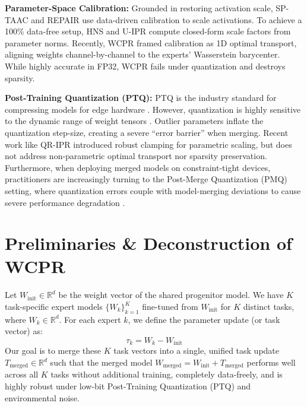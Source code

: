 \documentclass{article}
\theoremstyle{plain}
\theoremstyle{definition}
\theoremstyle{remark}
\begin{document}
\textbf{Parameter-Space Calibration:} Grounded in restoring activation scale, SP-TAAC \cite{leclaire2024isotropic} and REPAIR \cite{jordan2023repair} use data-driven calibration to scale activations. To achieve a 100\% data-free setup, HNS \cite{visionary2026hns} and U-IPR \cite{leclaire2024isotropic} compute closed-form scale factors from parameter norms. Recently, WCPR \cite{theorist2026wcpr} framed calibration as 1D optimal transport, aligning weights channel-by-channel to the experts' Wasserstein barycenter. While highly accurate in FP32, WCPR fails under quantization and destroys sparsity.

\textbf{Post-Training Quantization (PTQ):} PTQ is the industry standard for compressing models for edge hardware \cite{frantar2022gptq}. However, quantization is highly sensitive to the dynamic range of weight tensors \cite{xiao23smoothquant}. Outlier parameters inflate the quantization step-size, creating a severe ``error barrier'' when merging. Recent work like QR-IPR \cite{pragmatic2026unified} introduced robust clamping for parametric scaling, but does not address non-parametric optimal transport nor sparsity preservation. Furthermore, when deploying merged models on constraint-tight devices, practitioners are increasingly turning to the Post-Merge Quantization (PMQ) setting, where quantization errors couple with model-merging deviations to cause severe performance degradation \cite{epmq2026expert}.

\section{Preliminaries \& Deconstruction of WCPR}
\label{sec:prelim}
Let $W_{\text{init}} \in \mathbb{R}^{d}$ be the weight vector of the shared progenitor model. We have $K$ task-specific expert models $\{W_k\}_{k=1}^K$ fine-tuned from $W_{\text{init}}$ for $K$ distinct tasks, where $W_k \in \mathbb{R}^{d}$. For each expert $k$, we define the parameter update (or task vector) as:
\begin{equation}
    \tau_k = W_k - W_{\text{init}}
\end{equation}
Our goal is to merge these $K$ task vectors into a single, unified task update $T_{\text{merged}} \in \mathbb{R}^{d}$ such that the merged model $W_{\text{merged}} = W_{\text{init}} + T_{\text{merged}}$ performs well across all $K$ tasks without additional training, completely data-freely, and is highly robust under low-bit Post-Training Quantization (PTQ) and environmental noise.
\end{document}
